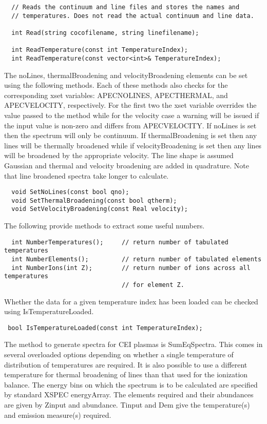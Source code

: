 \documentclass[11pt]{book}
\begin{document}
\begin{verbatim}
  // Reads the continuum and line files and stores the names and
  // temperatures. Does not read the actual continuum and line data.

  int Read(string cocofilename, string linefilename);

  int ReadTemperature(const int TemperatureIndex);
  int ReadTemperature(const vector<int>& TemperatureIndex);
\end{verbatim}

The noLines, thermalBroadening and velocityBroadening elements can be
set using the following methods. Each of these methods also checks for
the corresponding xset variables: APECNOLINES, APECTHERMAL, and
APECVELOCITY, respectively. For the first two the xset variable
overrides the value passed to the method while for the velocity case a
warning will be issued if the input value is non-zero and differs from
APECVELOCITY. If noLines is set then the spectrum will only be
continuum. If thermalBroadening is set then any lines will be
thermally broadened while if velocityBroadening is set then any lines
will be broadened by the appropriate velocity. The line shape is
assumed Gaussian and thermal and velocity broadening are added in
quadrature. Note that line broadened spectra take longer to calculate.

\begin{verbatim}
  void SetNoLines(const bool qno);
  void SetThermalBroadening(const bool qtherm);
  void SetVelocityBroadening(const Real velocity);
\end{verbatim}

The following provide methods to extract some useful numbers.

\begin{verbatim}
  int NumberTemperatures();     // return number of tabulated temperatures
  int NumberElements();         // return number of tabulated elements
  int NumberIons(int Z);        // return number of ions across all temperatures
                                // for element Z.
\end{verbatim}

Whether the data for a given temperature index has been loaded can be
checked using IsTemperatureLoaded.

\begin{verbatim}
 bool IsTemperatureLoaded(const int TemperatureIndex);
\end{verbatim}

The method to generate spectra for CEI plasmas is SumEqSpectra. This
comes in several overloaded options depending on whether a single
temperature of distribution of temperatures are required. It is also
possible to use a different temperature for thermal broadening of
lines than that used for the ionization balance. The energy bins on
which the spectrum is to be calculated are specified by standard XSPEC
energyArray. The elements required and their abundances are given by
Zinput and abundance. Tinput and Dem give the temperature(s) and
emission measure(s) required.
\end{document}
